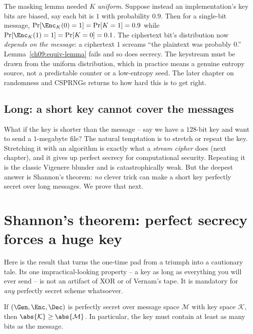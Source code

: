 The masking lemma needed $K$ \emph{uniform}. Suppose instead an implementation's key bits are biased, say each bit is $1$ with probability $0.9$. Then for a single-bit message, $\Pr[\Enc_K(0) = 1] = \Pr[K=1] = 0.9$ while $\Pr[\Enc_K(1) = 1] = \Pr[K=0] = 0.1$. The ciphertext bit's distribution now \emph{depends on the message}: a ciphertext $1$ screams ``the plaintext was probably $0$.'' Lemma~\ref{ch09:equiv-lemma} fails and so does secrecy. The keystream must be drawn from the uniform distribution, which in practice means a genuine entropy source, not a predictable counter or a low-entropy seed. The later chapter on randomness and CSPRNGs returns to how hard this is to get right.

\subsection{Long: a short key cannot cover the messages}
\label{ch09:must-long}

What if the key is shorter than the message -- say we have a $128$-bit key and want to send a $1$-megabyte file? The natural temptation is to stretch or repeat the key. Stretching it with an algorithm is exactly what a \emph{stream cipher} does (next chapter), and it gives up perfect secrecy for computational security. Repeating it is the classic Vigenere blunder and is catastrophically weak. But the deepest answer is Shannon's theorem: \emph{no} clever trick can make a short key perfectly secret over long messages. We prove that next.

\section{Shannon's theorem: perfect secrecy forces a huge key}
\label{ch09:key-length}

Here is the result that turns the one-time pad from a triumph into a cautionary tale. Its one impractical-looking property -- a key as long as everything you will ever send -- is not an artifact of XOR or of Vernam's tape. It is mandatory for \emph{any} perfectly secret scheme whatsoever.

\begin{theorem}
\label{ch09:shannon-bound}
If $(\Gen,\Enc,\Dec)$ is perfectly secret over message space $\mathcal{M}$ with key space $\mathcal{K}$, then $\abs{\mathcal{K}} \ge \abs{\mathcal{M}}$. In particular, the key must contain at least as many bits as the message.
\end{theorem}

